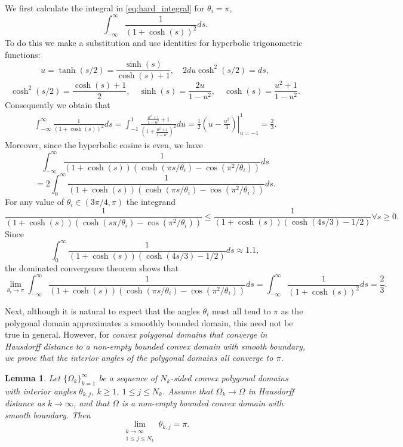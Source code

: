 \documentclass{amsart}
\newtheorem{lemma}[theorem]{Lemma}
\theoremstyle{definition}
\def\beq{\begin{eqnarray}}
\def\eeq{\end{eqnarray}}
\begin{document}
We first calculate the integral in \eqref{eq:hard_integral} for $\theta_i = \pi$, 
\[ \int_{-\infty} ^\infty \frac{1}{(1+\cosh(s))^2} ds. \]
To do this we make a substitution and use identities for hyperbolic trigonometric functions: 
\[ u = \tanh(s/2) = \frac{\sinh(s)}{\cosh(s)+1}, \quad 2 du \cosh^2(s/2) = ds,\] 
\[ \cosh^2(s/2) = \frac{\cosh(s)+1}{2}, \quad \sinh(s) = \frac{2u}{1-u^2}, \quad \cosh(s) = \frac{u^2+1}{1-u^2}.\] 
Consequently we obtain that 
\beq \int_{-\infty} ^\infty \frac{1}{(1+\cosh(s))^2} ds = \int_{-1} ^1 \frac{\frac{u^2+1}{1-u^2}+1}{(1+\frac{u^2+1}{1-u^2})^2}  du  = \left . \frac 1 2 \left( u - \frac{u^3}{3} \right) \right|_{u=-1} ^1 = \frac 2 3. \label{eq:integral_done} \eeq 
Moreover, since the hyperbolic cosine is even, we have 
\[ \int_{-\infty}^\infty \frac{1}{(1+\cosh(s))(\cosh(\pi s/\theta_i) - \cos(\pi^2/\theta_i))} ds \] 
\[= 2 \int_0 ^\infty  \frac{1}{(1+\cosh(s))(\cosh(\pi s/\theta_i) - \cos(\pi^2/\theta_i))} ds.\]
For any value of $\theta_i \in (3\pi/4, \pi)$ the integrand 
\[ \frac{1}{(1+\cosh(s))(\cosh(s\pi/\theta_i) - \cos(\pi^2/\theta_i))} \leq \frac{1}{(1+\cosh(s))(\cosh(4s/3) - 1/2)} \forall s \geq 0.\]
Since 
\[ \int_0 ^\infty \frac{1}{(1+\cosh(s))(\cosh(4s/3) - 1/2)}ds \approx 1.1,\]
the dominated convergence theorem shows that 
\[ \lim_{\theta_i \to \pi} \int_{-\infty}^\infty \frac{1}{(1+\cosh(s))(\cosh(\pi s/\theta_i) - \cos(\pi^2/\theta_i))} ds = \int_{-\infty} ^\infty \frac{1}{(1+\cosh(s))^2}ds = \frac 2 3. \]


Next, although it is natural to expect that the angles $\theta_i$ must all tend to $\pi$ as the polygonal domain approximates a smoothly bounded domain, this need not be true in general.  However, for \em convex \em polygonal domains that converge in Hausdorff distance to a non-empty bounded convex domain with smooth boundary, we prove that the interior angles of the polygonal domains all converge to $\pi$. 

\begin{lemma} \label{lemma:angles_go_to_pi}
Let $\{\Omega_k\}_{k=1}^\infty$ be a sequence of $N_k$-sided convex polygonal domains with interior angles $\theta_{k,j}$, $k \geq 1$, $1 \leq j \leq N_k$. Assume that $\overline{\Omega_k} \to \overline{\Omega}$ in Hausdorff distance as $k \to \infty$, and that  
     $\Omega$ is a non-empty bounded convex domain with smooth boundary. Then 
    \begin{equation*}
        \lim_{\substack{k \to \infty \\ 1 \leq j \leq N_k}} \theta_{k,j} = \pi.
    \end{equation*}
\end{lemma}
\end{document}
